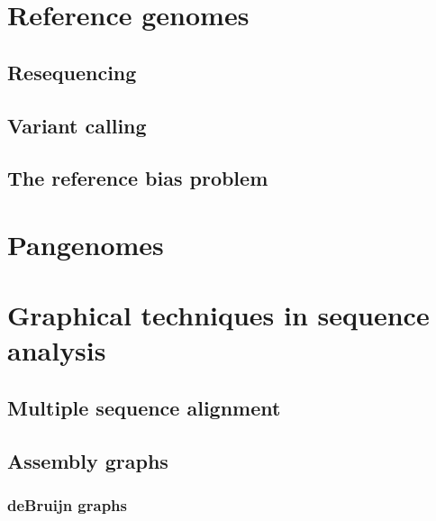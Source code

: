 \section{Reference genomes}


\subsection{Resequencing}



\subsection{Variant calling}


\subsection{The reference bias problem}


\section{Pangenomes}



\section{Graphical techniques in sequence analysis}

\subsection{Multiple sequence alignment}

\subsection{Assembly graphs}

\subsubsection{deBruijn graphs}

